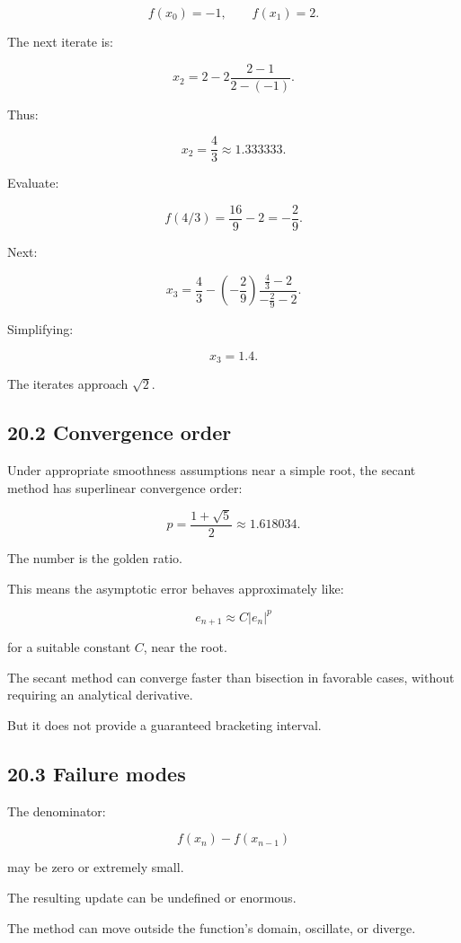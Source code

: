 \[ f(x_0)=-1,\qquad f(x_1)=2. \]

The next iterate is:

\[ x_2= 2- 2\frac{2-1}{2-(-1)}. \]

Thus:

\[ \boxed{x_2=\frac43\approx1.333333}. \]

Evaluate:

\[ f(4/3)=\frac{16}{9}-2=-\frac29. \]

Next:

\[ x_3= \frac43- \left(-\frac29\right) \frac{\frac43-2}{-\frac29-2}. \]

Simplifying:

\[ \boxed{x_3=1.4}. \]

The iterates approach \(\sqrt2\).

\subsection{20.2 Convergence order}\label{02-foundations-ii-ch028-convergence-order}

Under appropriate smoothness assumptions near a simple root, the secant method has superlinear convergence order:

\[ \boxed{ p=\frac{1+\sqrt5}{2}\approx1.618034 }. \]

The number is the golden ratio.

This means the asymptotic error behaves approximately like:

\[ e_{n+1}\approx C|e_n|^p \]

for a suitable constant \(C\), near the root.

The secant method can converge faster than bisection in favorable cases, without requiring an analytical derivative.

But it does not provide a guaranteed bracketing interval.

\subsection{20.3 Failure modes}\label{02-foundations-ii-ch028-failure-modes}

The denominator:

\[ f(x_n)-f(x_{n-1}) \]

may be zero or extremely small.

The resulting update can be undefined or enormous.

The method can move outside the function's domain, oscillate, or diverge.

